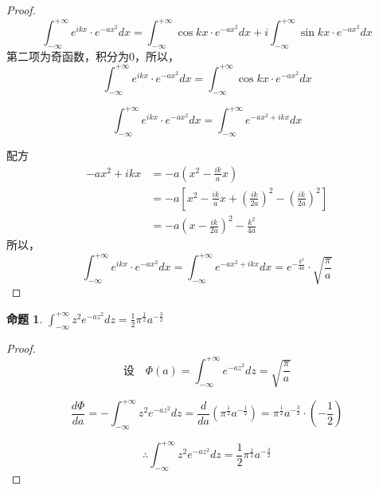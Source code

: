 \documentclass[12pt,a4paper]{article}
\numberwithin{subsection}{section}   %
\numberwithin{subsubsection}{subsection}
\theoremstyle{plain}
\theoremstyle{definition}
\newtheorem{example}{命题}[subsection]  %
\theoremstyle{remark}
\theoremstyle{remark}
\begin{document}
	\begin{proof}
		
		\begin{equation*}
			\int_{-\infty}^{+\infty} e^{ikx} \cdot e^{-a x^2} dx =\int_{-\infty}^{+\infty} \cos kx \cdot e^{-a x^2} dx+i\int_{-\infty}^{+\infty} \sin kx \cdot e^{-a x^2} dx
		\end{equation*}
		第二项为奇函数，积分为0，所以，
		\begin{equation*}
			\int_{-\infty}^{+\infty} e^{ikx} \cdot e^{-a x^2} dx =\int_{-\infty}^{+\infty} \cos kx \cdot e^{-a x^2} dx
		\end{equation*}
		
		\begin{equation*}
			\int_{-\infty}^{+\infty} e^{ikx} \cdot e^{-a x^2} dx = \int_{-\infty}^{+\infty} e^{-a x^2 + ikx} dx
		\end{equation*}
		
		配方
		\begin{equation*}
			\begin{split}
				-a x^2 + ikx &= -a \left( x^2 - \frac{ik}{a} x \right) \\
				&= -a \left[ x^2 - \frac{ik}{a} x + \left( \frac{ik}{2a} \right)^2 - \left( \frac{ik}{2a} \right)^2 \right] \\
				&= -a \left( x - \frac{ik}{2a} \right)^2 - \frac{k^2}{4a}
			\end{split}
		\end{equation*}
		所以，
		\begin{equation*}
			\int_{-\infty}^{+\infty} e^{ikx} \cdot e^{-a x^2} dx = \int_{-\infty}^{+\infty} e^{-a x^2 + ikx} dx	= e^{-\frac{k^2}{4a}} \cdot \sqrt{\frac{\pi}{a}}
		\end{equation*}
	\end{proof}
	
	
	\begin{example}\label{ex:4}
		$\int_{-\infty}^{+\infty} z^2 e^{-a z^2} dz = \frac{1}{2} \pi^{\frac{1}{2}} a^{-\frac{3}{2}}$
	\end{example}
	
	\begin{proof}
		
		
		\begin{equation*}
			\text{设} \quad \Phi(a) = \int_{-\infty}^{+\infty} e^{-a z^2} dz = \sqrt{\frac{\pi}{a}}
		\end{equation*}
		
		\begin{equation*}
			\frac{d\Phi}{da} = -\int_{-\infty}^{+\infty} z^2 e^{-a z^2} dz = \frac{d}{da} \left( \pi^{\frac{1}{2}} a^{-\frac{1}{2}} \right) = \pi^{\frac{1}{2}} a^{-\frac{3}{2}} \cdot \left( -\frac{1}{2} \right)
		\end{equation*}
		
		\begin{equation*}
			\therefore \int_{-\infty}^{+\infty} z^2 e^{-a z^2} dz = \frac{1}{2} \pi^{\frac{1}{2}} a^{-\frac{3}{2}}
		\end{equation*}
	\end{proof}
	
\end{document}
